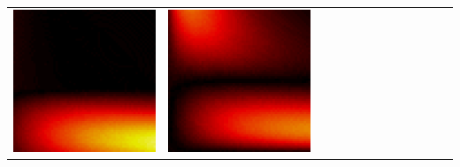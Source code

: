 \begin{landscape}
\begin{table}
\begin{tabular}{ccccccccccccc}
 \includegraphics[scale=0.04]{chapter5/figures/wrong_matrix_point_multiplication-diff-2.png}&
 \includegraphics[scale=0.04]{chapter5/figures/incorrect_interpolant-diff-2.png}&

\end{tabular}
\end{table}
\end{landscape}
